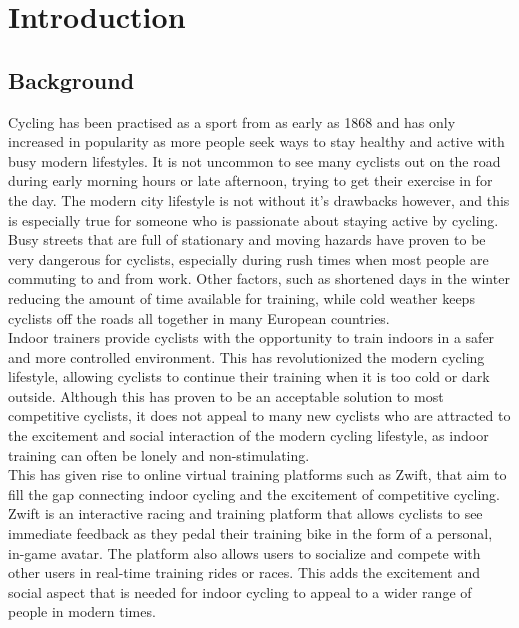 
\chapter{Introduction}

\section{Background}
Cycling has been practised as a sport from as early as 1868 \citep{Britannica:2022} and has only increased in popularity as more people seek ways to stay healthy and active with busy modern lifestyles. It is not uncommon to see many cyclists out on the road during early morning hours or late afternoon, trying to get their exercise in for the day.
The modern city lifestyle is not without it's drawbacks however, and this is especially true for someone who is passionate about staying active by cycling. Busy streets that are full of stationary and moving hazards have proven to be very dangerous for cyclists, especially during rush times when most people are commuting to and from work. Other factors, such as shortened days in the winter reducing the amount of time available for training, while cold weather keeps cyclists off the roads all together in many European countries.\\

Indoor trainers provide cyclists with the opportunity to train indoors in a safer and more controlled environment. This has revolutionized the modern cycling lifestyle, allowing cyclists to continue their training when it is too cold or dark outside. Although this has proven to be an acceptable solution to most competitive cyclists, it does not appeal to many new cyclists who are attracted to the excitement and social interaction of the modern cycling lifestyle, as indoor training can often be lonely and non-stimulating.\\

This has given rise to online virtual training platforms such as Zwift, that aim to fill the gap connecting indoor cycling and the excitement of competitive cycling. Zwift is an interactive racing and training platform that allows cyclists to see immediate feedback as they pedal their training bike in the form of a personal, in-game avatar. The platform also allows users to socialize and compete with other users in real-time training rides or races. This adds the excitement and social aspect that is needed for indoor cycling to appeal to a wider range of people in modern times.\\

